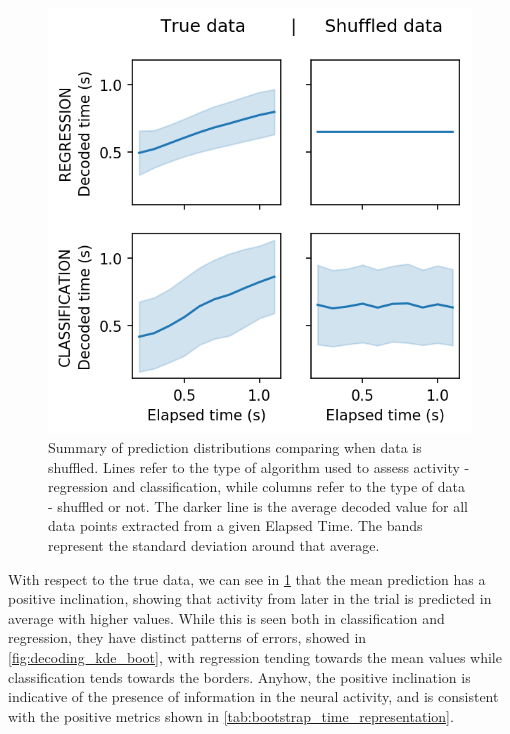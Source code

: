     \begin{figure}[ht]
        \centering
        \includegraphics{figures/decoding_line_bootstrap_vs_true_31.png}
        \caption[Summary of prediction distributions comparing when data is shuffled]{Summary of prediction distributions comparing when data is shuffled. Lines refer to the type of algorithm used to assess activity - regression and classification, while columns refer to the type of data - shuffled or not. The darker line is the average decoded value for all data points extracted from a given Elapsed Time. The bands represent the standard deviation around that average.}
        \label{fig:decoding_line_boot}
    \end{figure}
    
    With respect to the true data, we can see in \ref{fig:decoding_line_boot} that the mean prediction has a positive inclination, showing that activity from later in the trial is predicted in average with higher values. While this is seen both in classification and regression, they have distinct patterns of errors, showed in \ref{fig:decoding_kde_boot}, with regression tending towards the mean values while classification tends towards the borders. Anyhow, the positive inclination is indicative of the presence of information in the neural activity, and is consistent with the positive metrics shown in \ref{tab:bootstrap_time_representation}.
